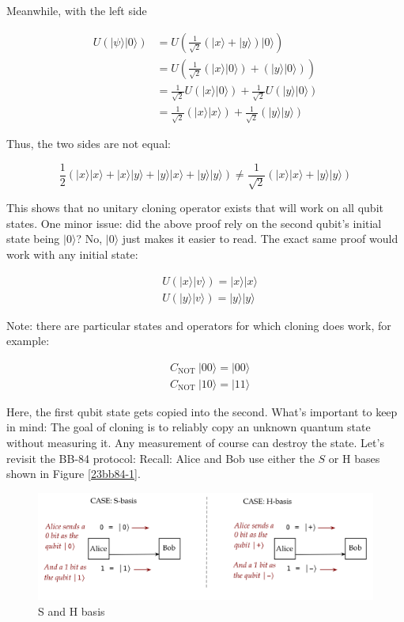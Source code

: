 \documentclass[main.tex]{subfiles}
\begin{document}
    Meanwhile, with the left side
    
    $$
    \begin{aligned}
    U(|\psi\rangle|0\rangle) &=U\left(\frac{1}{\sqrt{2}}(|x\rangle+|y\rangle)|0\rangle\right) \\
    &=U\left(\frac{1}{\sqrt{2}}(|x\rangle|0\rangle)+(|y\rangle|0\rangle)\right) \\
    &=\frac{1}{\sqrt{2}} U(|x\rangle|0\rangle)+\frac{1}{\sqrt{2}} U(|y\rangle|0\rangle) \\
    &=\frac{1}{\sqrt{2}}(|x\rangle|x\rangle)+\frac{1}{\sqrt{2}}(|y\rangle|y\rangle)
    \end{aligned}
    $$
    
    Thus, the two sides are not equal:
    
    $$
    \frac{1}{2}(|x\rangle|x\rangle+|x\rangle|y\rangle+|y\rangle|x\rangle+|y\rangle|y\rangle) \neq \frac{1}{\sqrt{2}}(|x\rangle|x\rangle+|y\rangle|y\rangle)
    $$
    
    This shows that no unitary cloning operator exists that will work on all qubit states. One minor issue: did the above proof rely on the second qubit's initial state being $|0\rangle$? No, $|0\rangle$ just makes it easier to read. The exact same proof would work with any initial state:
    
    $$
    \begin{aligned}
    &U(|x\rangle|v\rangle)=|x\rangle|x\rangle \\
    &U(|y\rangle|v\rangle)=|y\rangle|y\rangle
    \end{aligned}
    $$
    
    Note: there are particular states and operators for which cloning does work, for example:
    
    $$
    \begin{aligned}
    &C_{\text {NOT }}|00\rangle=|00\rangle \\
    &C_{\text {NOT }}|10\rangle=|11\rangle
    \end{aligned}
    $$
    
    Here, the first qubit state gets copied into the second. What's important to keep in mind: The goal of cloning is to reliably copy an unknown quantum state without measuring it. Any measurement of course can destroy the state. Let's revisit the BB-84 protocol: Recall: Alice and Bob use either the $S$ or H bases shown in Figure \ref{23bb84-1}.
    
    \begin{figure}
        \centering
        \includegraphics[width=5in]{notes/figs/n07/23bb84-1.png}
        \caption{S and H basis}
        \label{fig:23bb84-1}
    \end{figure}
    
\end{document}
